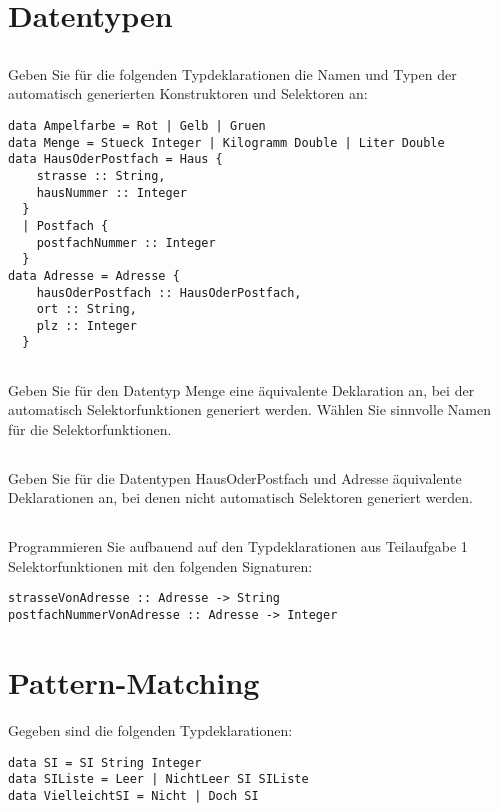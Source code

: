 \documentclass[
  10pt,                   %
  DIV12,
  german,                 %
  oneside,                %
  parskip=half,           %
  headings=normal,        %
  captions=tableheading,  %
]{scrartcl}
\begin{document}
\section{Datentypen}
\subsection{}
Geben Sie für die folgenden Typdeklarationen die Namen und Typen der automatisch generierten Konstruktoren und Selektoren an:
\begin{lstlisting}
data Ampelfarbe = Rot | Gelb | Gruen
data Menge = Stueck Integer | Kilogramm Double | Liter Double
data HausOderPostfach = Haus {
    strasse :: String,
    hausNummer :: Integer
  }
  | Postfach {
    postfachNummer :: Integer
  }
data Adresse = Adresse {
    hausOderPostfach :: HausOderPostfach,
    ort :: String,
    plz :: Integer
  }
\end{lstlisting}
\subsection{}
Geben Sie für den Datentyp Menge eine äquivalente Deklaration an, bei der automatisch Selektorfunktionen generiert werden. Wählen Sie sinnvolle Namen für die Selektorfunktionen.
\subsection{}
Geben Sie für die Datentypen HausOderPostfach und Adresse äquivalente Deklarationen an, bei denen nicht automatisch Selektoren generiert werden.
\subsection{}
Programmieren Sie aufbauend auf den Typdeklarationen aus Teilaufgabe 1 Selektorfunktionen mit den folgenden Signaturen:\\
\begin{lstlisting}
strasseVonAdresse :: Adresse -> String
postfachNummerVonAdresse :: Adresse -> Integer
\end{lstlisting}
\section{Pattern-Matching}
Gegeben sind die folgenden Typdeklarationen:
\begin{lstlisting}
data SI = SI String Integer
data SIListe = Leer | NichtLeer SI SIListe
data VielleichtSI = Nicht | Doch SI
\end{lstlisting}
\end{document}
